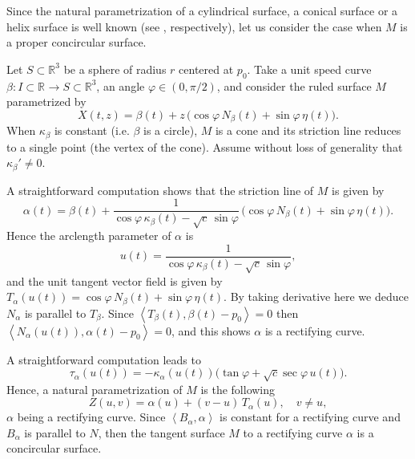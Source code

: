 \documentclass[eqnumis, pdf]{hjms}
\def\R#1{\ensuremath{\mathbb{R}^{#1}}}
\def\<{\left<}
\def\>{\right>}
\def\Y{Z}
\begin{document}
Since the natural parametrization of a cylindrical surface, a conical surface or a helix surface is well known (see \cite{IT1, Chen03, LO16a}, respectively), let us consider the case when $M$ is a proper concircular surface.

Let $S\subset\R3$ be a sphere of radius $r$ centered at $p_0$. Take a unit speed curve $\beta:I\subset\R{}\to S\subset\R3$, an angle $\varphi\in(0,\pi/2)$, and consider the ruled surface $M$ parametrized by
\[
X(t,z)=\beta(t)+z\,\big(\cos\varphi\, N_\beta(t)+\sin\varphi\, \eta(t)\big).
\]
When $\kappa_\beta$ is constant (i.e. $\beta$ is a circle), $M$ is a cone and its striction line reduces to a single point (the vertex of the cone). Assume without loss of generality that $\kappa_\beta'\neq0$.

A straightforward computation shows that the striction line of $M$ is given by
\[
\alpha(t)=\beta(t)+\frac1{\cos\varphi\,\kappa_\beta(t)-\sqrt{c}\,\sin\varphi}\,\big(\cos\varphi\, N_\beta(t)+\sin\varphi\, \eta(t)\big).
\]
Hence the arclength parameter of $\alpha$ is
\[
u(t)=\frac{1}{\cos\varphi\,\kappa_\beta(t)-\sqrt{c}\,\sin\varphi},
\]
and the unit tangent vector field is given by
\(
T_\alpha(u(t))=\cos\varphi\, N_\beta(t)+\sin\varphi\, \eta(t).
\)
By taking derivative here we deduce $N_\alpha$ is parallel to $T_\beta$. Since $\<T_\beta(t),\beta(t)-p_0\>=0$ then
$\<N_\alpha(u(t)),\alpha(t)-p_0\>=0$, and this shows $\alpha$ is a rectifying curve.

A straightforward computation leads to
\[
\tau_\alpha(u(t))=-\kappa_\alpha(u(t))\big(\tan\varphi+\sqrt{c}\sec\varphi\,u(t)\big).
\]
Hence, a natural parametrization of $M$ is the following
\begin{equation}\label{parY2}
\Y(u,v)=\alpha(u)+(v-u)\,T_\alpha(u),\quad v\neq u,
\end{equation}
$\alpha$ being a rectifying curve. Since $\<B_\alpha,\alpha\>$ is constant for a rectifying curve and $B_\alpha$ is parallel to $N$, then the tangent surface $M$ to a rectifying curve $\alpha$ is a concircular surface.
\end{document}

